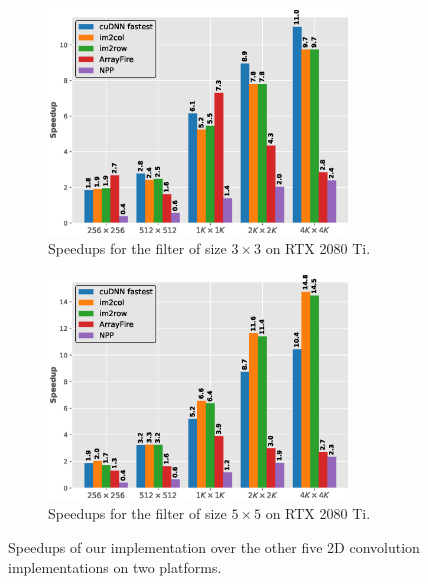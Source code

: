 \documentclass[sigplan,review,anonymous]{acmart}\settopmatter{printfolios=true,printccs=false,printacmref=false}
\begin{document}
\begin{figure}
	\begin{subfigure}{\columnwidth}
		\centering
		 \includegraphics[width=\columnwidth,height=6cm]{./figure/2d_norm_f3_rtx2080.eps}
		 \caption{Speedups for the filter of size $3 \times 3$ on RTX 2080 Ti.}
		 \label{fig:2druntimef3c12080}
	\end{subfigure}
	\begin{subfigure}{\columnwidth}
		\centering
		 \includegraphics[width=\columnwidth,height=6cm]{./figure/2d_norm_f5_rtx2080.eps}
		 \caption{Speedups for the filter of size $5 \times 5$ on RTX 2080 Ti.}
		 \label{fig:2druntimef5c12080}
	\end{subfigure}
	
	\caption{Speedups of our implementation over the other five 2D convolution implementations on two platforms.}
   \label{fig:2druntime}
\end{figure}
\end{document}
